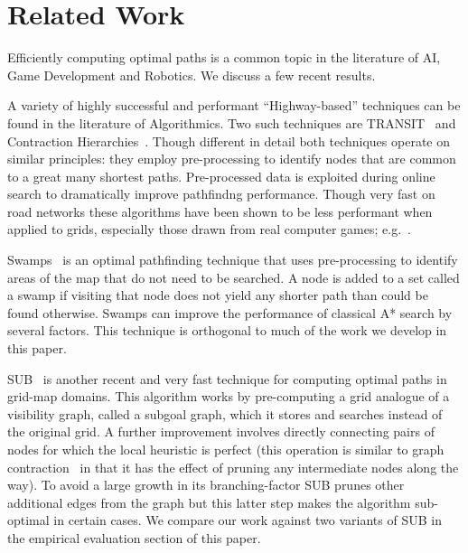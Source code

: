 \section{Related Work}
\label{sec::relatedwork}
Efficiently computing optimal paths is a common topic
in the literature of AI, Game Development and 
Robotics. We discuss a few recent results.

A variety of highly successful and performant ``Highway-based'' 
techniques can be found in the literature of Algorithmics. 
Two such techniques are TRANSIT~\cite{bast06} and Contraction
Hierarchies~\cite{geisberger08}. Though different in detail
both techniques operate on similar principles: they employ
pre-processing to identify nodes that
are common to a great many shortest paths. Pre-processed data is
exploited during online search to dramatically improve pathfindng 
performance. Though very fast on road networks these algorithms have
been shown to be less performant when applied to grids, especially
those drawn from real computer games;
e.g.~\cite{sturtevant10,antsfeld12,storandt13}.

Swamps~\cite{pochter10} is an optimal pathfinding technique
that uses pre-processing to identify areas of the map that do 
not need to be searched. A node is added to a set called a swamp
if visiting that node does not yield any shorter path than could
be found otherwise. Swamps can improve the performance of classical
A{*} search by several factors. This technique is orthogonal to much
of the work we develop in this paper.

SUB~\cite{urasKH13} is another recent and very fast technique 
for computing optimal paths in grid-map domains. 
This algorithm works by pre-computing a grid analogue of a visibility graph,
called a subgoal graph, which it stores and searches instead of the original
grid.
A further improvement involves directly connecting pairs of nodes
for which the local heuristic is perfect (this operation is similar 
to graph contraction~\cite{geisberger08} in that it has the effect of 
pruning any intermediate nodes along the way).
To avoid a large growth in its branching-factor SUB prunes other 
additional edges from the graph but this latter step makes the 
algorithm sub-optimal in certain cases. We compare our work against
two variants of SUB in the empirical evaluation section of this paper.

%
